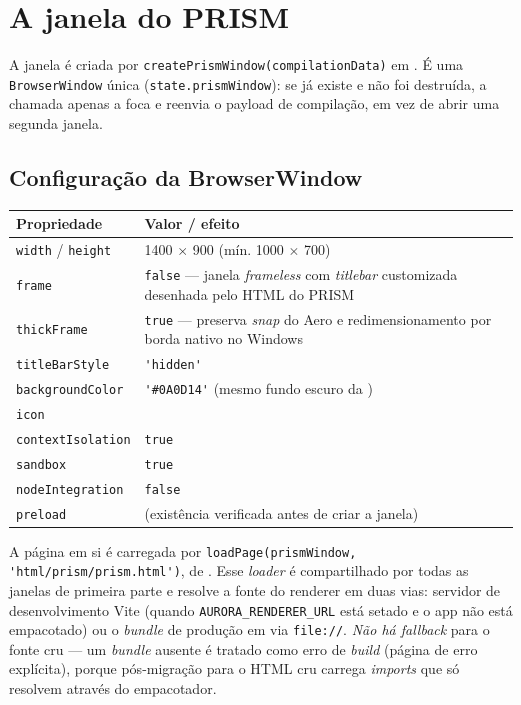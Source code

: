 \section{A janela do PRISM}

A janela é criada por \lstinline|createPrismWindow(compilationData)| em
. É uma \lstinline|BrowserWindow| única
(\lstinline|state.prismWindow|): se já existe e não foi destruída, a chamada
apenas a foca e reenvia o payload de compilação, em vez de abrir uma segunda
janela.

\subsection{Configuração da BrowserWindow}

\begin{tabularx}{\linewidth}{Y Z}
\toprule
\textbf{Propriedade} & \textbf{Valor / efeito} \\
\midrule
\lstinline|width| / \lstinline|height| & 1400 $\times$ 900 (mín. 1000 $\times$ 700) \\
\lstinline|frame| & \lstinline|false| --- janela \emph{frameless} com \emph{titlebar} customizada desenhada pelo HTML do PRISM \\
\lstinline|thickFrame| & \lstinline|true| --- preserva \emph{snap} do Aero e redimensionamento por borda nativo no Windows \\
\lstinline|titleBarStyle| & \lstinline|'hidden'| \\
\lstinline|backgroundColor| & \lstinline|'#0A0D14'| (mesmo fundo escuro da ) \\
\lstinline|icon| &  \\
\lstinline|contextIsolation| & \lstinline|true| \\
\lstinline|sandbox| & \lstinline|true| \\
\lstinline|nodeIntegration| & \lstinline|false| \\
\lstinline|preload| &  (existência verificada antes de criar a janela) \\
\bottomrule
\end{tabularx}

A página em si é carregada por \lstinline|loadPage(prismWindow, 'html/prism/prism.html')|,
de . Esse \emph{loader} é compartilhado por todas as
janelas de primeira parte e resolve a fonte do renderer em duas vias: servidor de
desenvolvimento Vite (quando \lstinline|AURORA_RENDERER_URL| está setado e o app
não está empacotado) ou o \emph{bundle} de produção em  via
\lstinline|file://|. \emph{Não há \emph{fallback}} para o fonte cru --- um
\emph{bundle} ausente é tratado como erro de \emph{build} (página de erro
explícita), porque pós-migração para  o HTML cru carrega \emph{imports}
que só resolvem através do empacotador.

